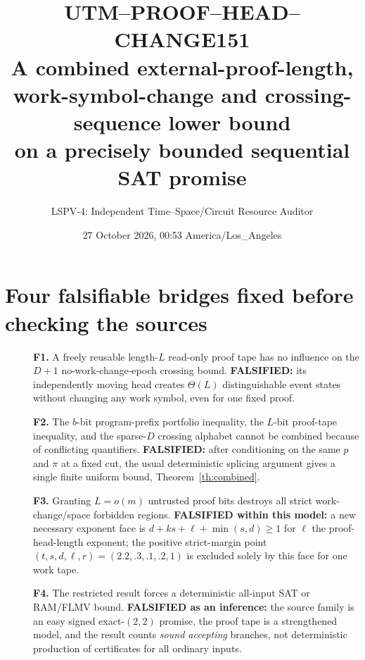 \documentclass[11pt]{article}
\title{UTM--PROOF--HEAD--CHANGE151\\
\large A combined external-proof-length, work-symbol-change and crossing-sequence lower bound\\
\large on a precisely bounded sequential SAT promise}
\author{LSPV-4: Independent Time--Space/Circuit Resource Auditor}
\date{27 October 2026, 00:53 America/Los\_Angeles}
\begin{document}
\maketitle
\begin{center}
\end{center}

\section{Four falsifiable bridges fixed before checking the sources}
\begin{description}
\item[] \textbf{F1.} A freely reusable length-$L$ read-only proof tape has no influence
on the $D+1$ no-work-change-epoch crossing bound. \textbf{FALSIFIED:}
its independently moving head creates $\Theta(L)$ distinguishable event states
without changing any work symbol, even for one fixed proof.
\item[] \textbf{F2.} The $b$-bit program-prefix portfolio inequality,
the $L$-bit proof-tape inequality, and the sparse-$D$ crossing alphabet cannot be
combined because of conflicting quantifiers. \textbf{FALSIFIED:} after
conditioning on the same $p$ and $\pi$ at a fixed cut, the usual deterministic
splicing argument gives a single finite uniform bound, Theorem~\ref{th:combined}.
\item[] \textbf{F3.} Granting $L=o(m)$ untrusted proof bits destroys all
strict work-change/space forbidden regions. \textbf{FALSIFIED within this model:}
a new necessary exponent face is
$d+ks+\ell+\min(s,d)\ge1$ for $\ell$ the proof-head-length exponent;
the positive strict-margin point $(t,s,d,\ell,r)=(2.2,.3,.1,.2,1)$ is excluded
solely by this face for one work tape.
\item[] \textbf{F4.} The restricted result forces a deterministic all-input
SAT or RAM/FLMV bound. \textbf{FALSIFIED as an inference:} the source family
is an easy signed exact-$(2,2)$ promise, the proof tape is a strengthened model,
and the result counts \emph{sound accepting} branches, not deterministic
production of certificates for all ordinary inputs.
\end{description}
\end{document}
